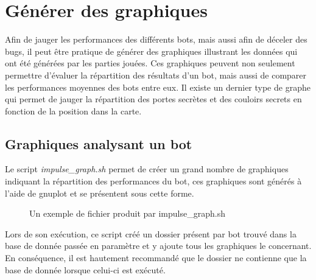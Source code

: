 \documentclass[10pt,a4paper]{report}
\begin{document}
\section{Générer des graphiques}
Afin de jauger les performances des différents bots, mais aussi afin de
déceler des bugs, il peut être pratique de générer des graphiques illustrant les
données qui ont été générées par les parties jouées. Ces graphiques peuvent
non seulement permettre d'évaluer la répartition des résultats d'un bot,
mais aussi de comparer les performances moyennes des bots entre eux. Il existe
un dernier type de graphe qui permet de jauger la répartition des portes
secrètes et des couloirs secrets en fonction de la position dans la carte.

\subsection{Graphiques analysant un bot}
Le script \emph{impulse\_graph.sh} permet de créer un grand nombre de
graphiques indiquant la répartition des performances du bot, ces graphiques
sont générés à l'aide de gnuplot et se présentent sous cette forme.

\begin{figure}[H]
	\caption{\label{fig:impulse_graph} Un exemple de fichier produit par impulse\_graph.sh}
\end{figure}

Lors de son exécution, ce script créé un dossier présent par bot trouvé dans
la base de donnée passée en paramètre et y ajoute tous les graphiques le
concernant. En conséquence, il est hautement recommandé que le dossier ne
contienne que la base de donnée lorsque celui-ci est exécuté.
\end{document}
